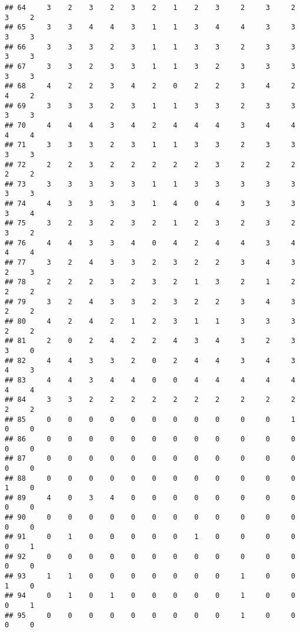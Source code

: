\documentclass[
]{article}
\begin{document}
\begin{verbatim}
## 64     3    2    3    2    3    2    1    2    3     2     3     2     3     2
## 65     3    3    4    4    3    1    1    3    4     4     3     3     3     3
## 66     3    3    3    2    3    1    1    3    3     2     3     3     3     3
## 67     3    3    2    3    3    1    1    3    2     3     3     3     3     3
## 68     4    2    2    3    4    2    0    2    2     3     4     2     4     2
## 69     3    3    3    2    3    1    1    3    3     2     3     3     3     3
## 70     4    4    4    3    4    2    4    4    4     3     4     4     4     4
## 71     3    3    3    2    3    1    1    3    3     2     3     3     3     3
## 72     2    2    3    2    2    2    2    2    3     2     2     2     2     2
## 73     3    3    3    3    3    1    1    3    3     3     3     3     3     3
## 74     4    3    3    3    3    1    4    0    4     3     3     3     3     4
## 75     3    2    3    2    3    2    1    2    3     2     3     2     3     2
## 76     4    4    3    3    4    0    4    2    4     4     3     4     4     4
## 77     3    2    4    3    3    2    3    2    2     3     4     3     2     3
## 78     2    2    2    3    2    3    2    1    3     2     1     2     2     2
## 79     3    2    4    3    3    2    3    2    2     3     4     3     2     2
## 80     4    2    4    2    1    2    3    1    1     3     3     3     2     2
## 81     2    0    2    4    2    2    4    3    4     3     2     3     3     0
## 82     4    4    3    3    2    0    2    4    4     3     4     3     4     3
## 83     4    4    3    4    4    0    0    4    4     4     4     4     4     4
## 84     3    3    2    2    2    2    2    2    2     2     2     2     2     2
## 85     0    0    0    0    0    0    0    0    0     0     0     1     0     0
## 86     0    0    0    0    0    0    0    0    0     0     0     0     0     0
## 87     0    0    0    0    0    0    0    0    0     0     0     0     0     0
## 88     0    0    0    0    0    0    0    0    0     0     0     0     1     0
## 89     4    0    3    4    0    0    0    0    0     0     0     0     0     0
## 90     0    0    0    0    0    0    0    0    0     0     0     0     0     0
## 91     0    1    0    0    0    0    0    1    0     0     0     0     0     1
## 92     0    0    0    0    0    0    0    0    0     0     0     0     0     0
## 93     1    1    0    0    0    0    0    0    0     1     0     0     1     0
## 94     0    1    0    1    0    0    0    0    0     1     0     0     0     1
## 95     0    0    0    0    0    0    0    0    0     1     0     0     0     0

\end{verbatim}
\end{document}

